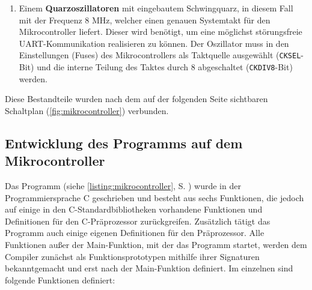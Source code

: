 \begin{enumerate}
\item Einem \textbf{Quarzoszillatoren} mit eingebautem Schwingquarz, in diesem Fall mit der Frequenz 8 MHz, welcher einen genauen Systemtakt für den Mikrocontroller liefert. Dieser wird benötigt, um eine möglichst störungsfreie UART-Kommunikation realisieren zu können. Der Oszillator muss in den Einstellungen (Fuses) des Mikrocontrollers als Taktquelle ausgewählt (\texttt{CKSEL}-Bit) und die interne Teilung des Taktes durch 8 abgeschaltet (\texttt{CKDIV8}-Bit) werden.
\end{enumerate}
Diese Bestandteile wurden nach dem auf der folgenden Seite sichtbaren Schaltplan (\autoref{fig:mikrocontroller}) verbunden.
\subsection{Entwicklung des Programms auf dem Mikrocontroller}
Das Programm (siehe \autoref{listing:mikrocontroller}, S. \pageref{listing:mikrocontroller}) wurde in der Programmiersprache C geschrieben und besteht aus sechs Funktionen, die jedoch auf einige in den C-Standardbibliotheken vorhandene Funktionen und Definitionen für den C-Präprozessor zurückgreifen. Zusätzlich tätigt das Programm auch einige eigenen Definitionen für den Präprozessor. Alle Funktionen außer der Main-Funktion, mit der das Programm startet, werden dem Compiler zunächst als Funktionsprototypen mithilfe ihrer Signaturen bekanntgemacht und erst nach der Main-Funktion definiert. Im einzelnen sind folgende Funktionen definiert:
